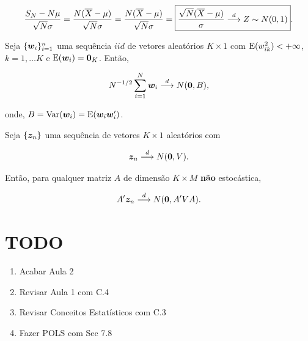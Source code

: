 \documentclass[11pt, oneside, a4paper, article]{article}
\numberwithin{equation}{section}
\begin{document}
\begin{description}
\begin{description}
\begin{defn}
\begin{align*}
\frac{S_{N} - N \mu }{ \sqrt{N} \sigma}
=
\frac{N ( \overline{X} - \mu ) }{ \sqrt{N} \sigma}
=
\frac{N ( \overline{X} - \mu ) }{ \sqrt{N} \sigma}
=
\boxed{
\frac{\sqrt{N} ( \overline{X} - \mu ) }{\sigma}
 \overset{d}{\longrightarrow}  Z \sim N(0,1)}.
\end{align*}
\end{defn}

\begin{defn} \label{def:tcl:vec}
Seja $\{\boldsymbol{w}_{i}\}_{i=1}^{n}$ uma sequência $iid$ de vetores aleatórios $K \times 1$ com
$\text{E}( w_{ik}^{2} ) < + \infty$, $k= 1, \dots K$ e $\text{E}( \boldsymbol{w}_{i} ) = \boldsymbol{0}_{K}$.
Então,

\vspace{-1 em}
\begin{align*}
	N^{-1/2} \sum_{i=1}^{N} \boldsymbol{w}_{i}  \overset{d}{\longrightarrow}  N(\boldsymbol{0}, B),
\end{align*}

\noindent
onde, $B=\text{Var}(\boldsymbol{w}_{i}) = \text{E}( \boldsymbol{w}_{i} \boldsymbol{w}_{i}')$.
\end{defn}

\begin{defn}[]
Seja $\{\boldsymbol{z}_{n}\}$ uma sequência de vetores $K \times 1$ aleatórios com 

\vspace{-1 em}
\begin{align*}
	\boldsymbol{z}_{n}  \overset{d}{\longrightarrow}  N(\boldsymbol{0}, V).
\end{align*}

Então, para qualquer matriz $A$ de dimensão $K \times M$ \textbf{não} estocástica,

\vspace{-1 em}
\begin{align*}
	A' \boldsymbol{z}_{n}  \overset{d}{\longrightarrow}  N(\boldsymbol{0}, A'VA).
\end{align*}
\end{defn}

\clearpage
\section*{TODO}

\begin{enumerate}[noitemsep]
	\item Acabar Aula 2
	\item Revisar Aula 1 com C.4
	\item Revisar Conceitos Estatísticos com C.3
	\item Fazer POLS com Sec 7.8
\end{enumerate}


\end{description}
\end{description}
\end{document}
